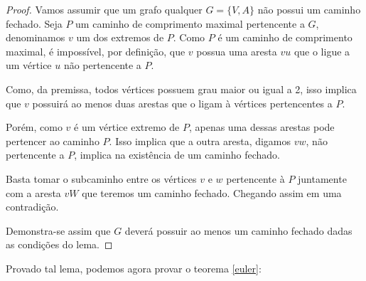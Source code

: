 \documentclass{article}
\begin{document}
\begin{proof}
	Vamos assumir que um grafo qualquer $G = \{V, A\}$ não possui um caminho fechado. 
	Seja $P$ um caminho de comprimento maximal pertencente a $G$, denominamos $v$ um dos extremos de $P$. 
	Como $P$ é um caminho de comprimento maximal, é impossível, por definição, que $v$ possua uma aresta $vu$ que o ligue a um vértice $u$ não pertencente a $P$.
	
	Como, da premissa, todos vértices possuem grau maior ou igual a 2, isso implica que $v$ possuirá ao menos duas arestas que o ligam à vértices pertencentes a $P$.

	Porém, como $v$ é um vértice extremo de $P$, apenas uma dessas arestas pode pertencer ao caminho $P$. Isso implica que a outra aresta, digamos $vw$, não pertencente a $P$, implica na existência de um caminho fechado.

	Basta tomar o subcaminho entre os vértices $v$ e $w$ pertencente à $P$ juntamente com a aresta $vW$ que teremos um caminho fechado. Chegando assim em uma contradição.

	Demonstra-se assim que $G$ deverá possuir ao menos um caminho fechado dadas as condições do lema.
\end{proof}

Provado tal lema, podemos agora provar o teorema \ref{euler}:
\end{document}
